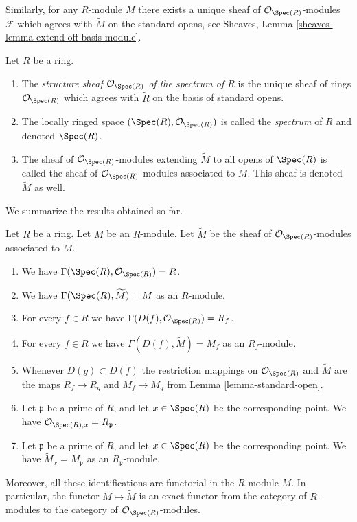 \medskip\noindent
Similarly, for any $R$-module $M$ there exists
a unique sheaf of $\mathcal{O}_{\Spec(R)}$-modules
$\mathcal{F}$ which agrees with $\widetilde M$ on the
standard opens, see
Sheaves, Lemma \ref{sheaves-lemma-extend-off-basis-module}.

\begin{definition}
\label{definition-structure-sheaf}
Let $R$ be a ring.
\begin{enumerate}
\item The {\it structure sheaf $\mathcal{O}_{\Spec(R)}$ of the
spectrum of $R$} is the unique sheaf of rings $\mathcal{O}_{\Spec(R)}$
which agrees with $\widetilde R$ on the basis of standard opens.
\item The locally ringed space
$(\Spec(R), \mathcal{O}_{\Spec(R)})$ is called
the {\it spectrum} of $R$ and denoted $\Spec(R)$.
\item The sheaf of $\mathcal{O}_{\Spec(R)}$-modules
extending $\widetilde M$ to all opens of $\Spec(R)$
is called the sheaf of $\mathcal{O}_{\Spec(R)}$-modules
associated to $M$. This sheaf is denoted $\widetilde M$ as
well.
\end{enumerate}
\end{definition}

\noindent
We summarize the results obtained so far.

\begin{lemma}
\label{lemma-spec-sheaves}
Let $R$ be a ring. Let $M$ be an $R$-module. Let $\widetilde M$
be the sheaf of $\mathcal{O}_{\Spec(R)}$-modules
associated to $M$.
\begin{enumerate}
\item We have $\Gamma(\Spec(R), \mathcal{O}_{\Spec(R)}) = R$.
\item We have $\Gamma(\Spec(R), \widetilde M) = M$ as an $R$-module.
\item For every $f \in R$ we have
$\Gamma(D(f), \mathcal{O}_{\Spec(R)}) = R_f$.
\item For every $f\in R$ we have $\Gamma(D(f), \widetilde M) = M_f$
as an $R_f$-module.
\item Whenever $D(g) \subset D(f)$ the restriction mappings
on $\mathcal{O}_{\Spec(R)}$ and $\widetilde M$
are the maps
$R_f \to R_g$ and $M_f \to M_g$ from Lemma
\ref{lemma-standard-open}.
\item Let $\mathfrak p$ be a prime of $R$, and let $x \in \Spec(R)$
be the corresponding point. We have
$\mathcal{O}_{\Spec(R), x} = R_{\mathfrak p}$.
\item Let $\mathfrak p$ be a prime of $R$, and let $x \in \Spec(R)$
be the corresponding point. We have $\widetilde M_x = M_{\mathfrak p}$
as an $R_{\mathfrak p}$-module.
\end{enumerate}
Moreover, all these identifications are functorial in the $R$
module $M$. In particular, the functor $M \mapsto \widetilde M$
is an exact functor from the category of $R$-modules
to the category of $\mathcal{O}_{\Spec(R)}$-modules.
\end{lemma}

